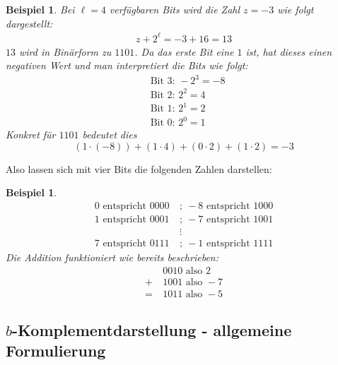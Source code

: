 \documentclass{article}
\newtheorem{beispiel}[satz]{Beispiel}
\begin{document}
    \begin{beispiel} \label{bsp:Komplementdarstellung_Erklärung}
      Bei $\ell=4$ verfügbaren Bits wird die Zahl $z=-3$ wie folgt dargestellt:
      \begin{align*}
        z+2^\ell = -3+16 = 13
      \end{align*}
      $13$ wird in Binärform zu $1101$.
      Da das erste Bit eine $1$ ist, hat dieses einen negativen Wert und man interpretiert die Bits wie folgt:
      \begin{align*}
        &\text{Bit 3: } -2^3 = -8 \\
        &\text{Bit 2: } 2^2 = 4 \\
        &\text{Bit 1: } 2^1 = 2 \\
        &\text{Bit 0: } 2^0 = 1
      \end{align*}
      Konkret für $1101$ bedeutet dies
      \begin{equation*}
        (1 \cdot (-8)) + (1 \cdot 4) + (0 \cdot 2) + (1 \cdot 2) = -3
      \end{equation*}
    \end{beispiel}

    \vspace{\baselineskip}

    Also lassen sich mit vier Bits die folgenden Zahlen darstellen:
    \begin{beispiel} \label{bsp:Komplementdarstellung_4Bits}
      \begin{align*}
        0 \text{ entspricht } 0000  ~&;~  -8 \text{ entspricht } 1000 \\
        1 \text{ entspricht } 0001  ~&;~  -7 \text{ entspricht } 1001 \\
        & \vdots \\
        7 \text{ entspricht } 0111  ~&;~  -1 \text{ entspricht } 1111
      \end{align*}    
      Die Addition funktioniert wie bereits beschrieben:
      \begin{align*}
        &0010 \text{ also } 2 \\
        +~ &1001 \text{ also } -7 \\
        =~ &1011 \text{ also } -5
      \end{align*}
    \end{beispiel}


\subsection{$b$-Komplementdarstellung - allgemeine Formulierung}
\end{document}
